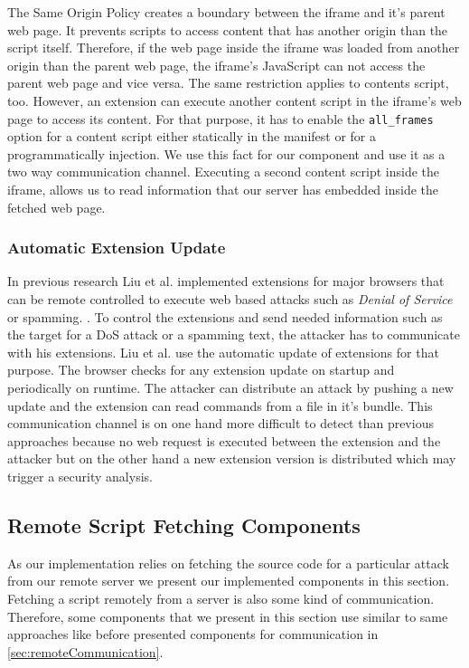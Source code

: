 	The Same Origin Policy creates a boundary between the iframe and it's parent web page. It prevents scripts to access content that has another origin than the script itself. Therefore, if the web page inside the iframe was loaded from another origin than the parent web page, the iframe's JavaScript can not access the parent web page and vice versa. The same restriction applies to contents script, too. However, an extension can execute another content script in the iframe's web page to access its content. For that purpose, it has to enable the \texttt{all\_frames} option for a content script either statically in the manifest or for a programmatically injection. We use this fact for our component and use it as a two way communication channel. Executing a second content script inside the iframe, allows us to read information that our server has embedded inside the fetched web page.

\subsubsection{Automatic Extension Update}
\label{sec:automaticExtensionUpdate}

	In previous research Liu et al. implemented extensions for major browsers that can be remote controlled to execute web based attacks such as \textit{Denial of Service} or spamming. \cite{liu2011botnet, Liu12chromeextensions:}. To control the extensions and send needed information such as the target for a DoS attack or a spamming text, the attacker has to communicate with his extensions. Liu et al. use the automatic update of extensions for that purpose. The browser checks for any extension update on startup and periodically on runtime. The attacker can distribute an attack by pushing a new update and the extension can read commands from a file in it's bundle. This communication channel is on one hand more difficult to detect than previous approaches because no web request is executed between the extension and the attacker but on the other hand a new extension version is distributed which may trigger a security analysis. 

\subsection{Remote Script Fetching Components}
	
	As our implementation relies on fetching the source code for a particular attack from our remote server we present our implemented components in this section. Fetching a script remotely from a server is also some kind of communication. Therefore, some components that we present in this section use similar to same approaches like before presented components for communication in \autoref{sec:remoteCommunication}. 
	
